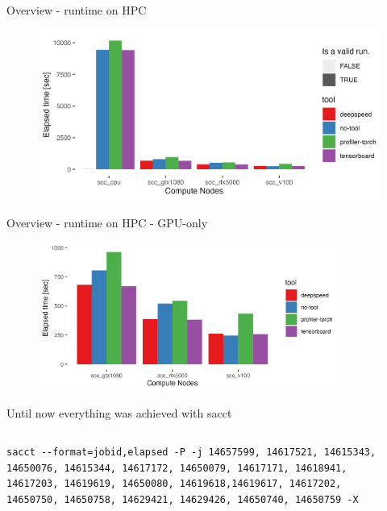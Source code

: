\documentclass[compress,aspectratio=169]{beamer}
\begin{document}
\begin{frame}{Overview - runtime on HPC}
    \begin{center}
    \begin{figure}
        \includegraphics[width=1\textwidth]{../../data/sacct_barplot_by_nodes_no-experiment}
    \end{figure}
    \end{center}
\end{frame}

\begin{frame}{Overview - runtime on HPC - GPU-only}
    \begin{center}
    \begin{figure}
        \includegraphics[width=0.87\textwidth]{../../data/sacct_barplot_by_nodes_no-experiment_gpu}
    \end{figure}
    \end{center}
\end{frame}

\begin{frame}[fragile]{Until now everything was achieved with sacct}
\begin{columns}
\begin{column}{0.7\textwidth}
        \begin{verbatim}
sacct --format=jobid,elapsed -P -j 14657599, 14617521, 14615343, 14650076, 14615344, 14617172, 14650079, 14617171, 14618941, 14617203, 14619619, 14650080, 14619618,14619617, 14617202, 14650750, 14650758, 14629421, 14629426, 14650740, 14650759 -X
        \end{verbatim}
\end{column}

\begin{column}{0.3\textwidth}
    \vspace{-2em}
        \inputminted[xleftmargin=1em,linenos,fontsize=\tiny,]{python}{../../data/sacct.out}
\end{column}
\end{columns}
\end{frame}
\end{document}
